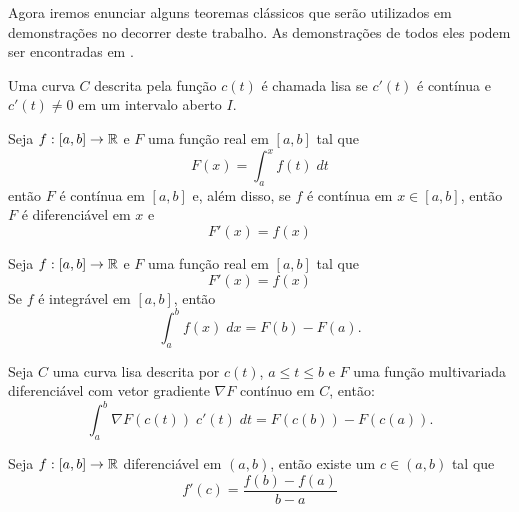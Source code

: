 Agora iremos enunciar alguns teoremas clássicos que serão utilizados em demonstrações no decorrer deste trabalho. As demonstrações de todos eles podem ser encontradas em \cite{rudin1976principles}.

\begin{definition}
    Uma curva $C$ descrita pela função $c(t)$ é chamada lisa se $c'(t)$ é contínua e $c'(t)\neq 0$ em um intervalo aberto $I$.
\end{definition}

\begin{theorem}
    \label{teoFCparte1}
    Seja $f:[a,b]\to\mathbb{R}$ e $F$ uma função real em $[a,b]$ tal que
    \begin{equation*}
        F(x)=\int_a^x f(t) \; dt
    \end{equation*}
   então $F$ é contínua em $[a,b]$ e, além disso, se $f$ é contínua em $x\in[a,b]$, então $F$ é diferenciável em $x$ e
    \begin{equation*}
        F'(x)=f(x)
    \end{equation*}
\end{theorem}

\begin{theorem}
    \label{teoFC}
    Seja $f:[a,b]\to\mathbb{R}$ e $F$ uma função real em $[a,b]$ tal que
    \begin{equation*}
        F'(x)=f(x)
    \end{equation*}
    Se $f$ é integrável em $[a,b]$, então
    \begin{equation*}
        \int_a^b f(x) \; dx = F(b)-F(a).
    \end{equation*}
\end{theorem}

\begin{theorem}
    \label{teoGradiente}
    Seja $C$ uma curva lisa descrita por $c(t)$, $a\leq t\leq b$ e $F$ uma função multivariada diferenciável com vetor gradiente $\nabla F$ contínuo em $C$, então:
    \begin{equation*}
        \int_a^b \nabla F(c(t)) \; c'(t) \; dt = F(c(b))-F(c(a)).
    \end{equation*}
\end{theorem} 

\begin{theorem}
    \label{teoValorMedio}
    Seja $f:[a,b]\to\mathbb{R}$ diferenciável em $(a,b)$, então existe um $c\in(a,b)$ tal que
    \begin{equation}
        f'(c) = \frac{f(b)-f(a)}{b-a}
    \end{equation}
\end{theorem}

